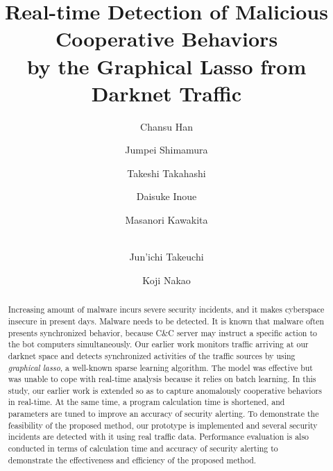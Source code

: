 \documentclass{sig-alternate-10pt}
\begin{document}
\title{Real-time Detection of Malicious Cooperative Behaviors\\by the Graphical Lasso from Darknet Traffic}

\author[1, 2]{\large Chansu Han}
\author[3]{\large Jumpei Shimamura}
\author[2]{\large Takeshi Takahashi}
\author[2]{\large Daisuke Inoue}
\author[1]{\large Masanori Kawakita}
\author[1, 2]{\large \\Jun'ichi Takeuchi}
\author[2]{\large Koji Nakao}



\maketitle

\begin{abstract}
Increasing amount of malware incurs severe security incidents, and it makes cyberspace insecure in present days.
Malware needs to be detected.
It is known that malware often presents synchronized behavior, because C\&C server may instruct a specific action to the bot computers simultaneously.
Our earlier work monitors traffic arriving at our darknet space and detects synchronized activities of the traffic sources by using {\it graphical lasso}, a well-known sparse learning algorithm.
The model was effective but was unable to cope with real-time analysis because it relies on batch learning.
In this study, our earlier work is extended so as to capture anomalously cooperative behaviors in real-time.
At the same time, a program calculation time is shortened, and parameters are tuned to improve an accuracy of security alerting.
To demonstrate the feasibility of the proposed method, our prototype is implemented and several security incidents are detected with it using real traffic data.
Performance evaluation is also conducted in terms of calculation time and accuracy of security alerting to demonstrate the effectiveness and efficiency of the proposed method.
\end{abstract}

\end{document}

